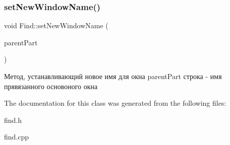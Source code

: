 \subsubsection{\texorpdfstring{setNewWindowName()}{setNewWindowName()}}
{\footnotesize\ttfamily void Find\+::set\+New\+Window\+Name (\begin{DoxyParamCaption}\item[{Q\+String}]{parent\+Part }\end{DoxyParamCaption})}

Метод, устанавливающий новое имя для окна parent\+Part строка -\/ имя прявязанного основоного окна 

The documentation for this class was generated from the following files\+:\begin{DoxyCompactItemize}
\item 
find.\+h\item 
find.\+cpp\end{DoxyCompactItemize}
